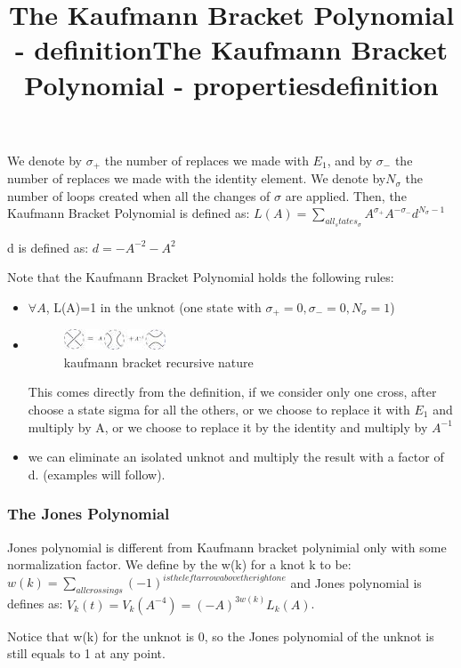 \documentclass{article}
\begin{document}
{\title{The Kaufmann Bracket Polynomial - definition} 
We denote by \(\sigma_{+}\) the number of replaces we made with \(E_{1}\), and by 
\(\sigma_{-}\) the number of replaces we made with the identity element.
We denote by\(N_{\sigma}\) the number of loops created when all the changes of \(\sigma\) are applied.
Then, the Kaufmann Bracket Polynomial is defined as:
\( L(A) = \sum\limits_{all_states_\sigma}{A^{\sigma_{+}} A^{-\sigma_{-}}d^{N_{\sigma} - 1}}\)

d is defined as: \(d = -A^{-2} -A^2\) 



\title{The Kaufmann Bracket Polynomial - properties} 
Note that the  Kaufmann Bracket Polynomial holds the following rules:
\begin{itemize}
\item \(\forall A\), L(A)=1 in the unknot (one state with \(\sigma_{+}=0,\sigma_{-}=0, N_{\sigma} = 1\))
\item 
\begin{figure}
\includegraphics[scale=1]{kaufmann_bracket_identity} 
\caption{kaufmann bracket recursive nature}
\end{figure}
This comes directly from the definition, if we consider only one cross, after choose a state sigma for all the others, or we choose to replace it with \(E_{1}\) and multiply by A, or we choose to replace it by the identity and multiply by \(A^{-1}\)
\item we can eliminate an isolated unknot and multiply the result with a factor of d. (examples will follow). 
\end{itemize}


\subsubsection{The Jones Polynomial}
\title{definition}
Jones polynomial is different from Kaufmann bracket polynimial only with some normalization factor.
We define by the w(k) for a knot k to be: \(w(k) = \sum\limits_{all crossings}{(-1)^{is the left arrow above the right one}}\)
and Jones polynomial is defines as: \(V_{k}(t)=V_{k}(A^{-4})=(-A)^{3w(k)}L_{k}(A)\).

Notice that w(k) for the unknot is 0, so the Jones polynomial of the unknot is still equals to 1 at any point.



}
\end{document}
